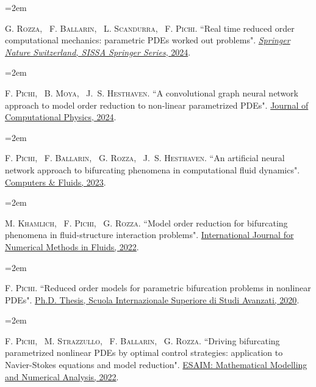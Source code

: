 \documentclass[
  usegeometry%
]{scrartcl}
\newcommand{\MarginText}[1]{\marginpar{\raggedleft\itshape\small#1}} %
\newcommand{\Description}[1]{\hangindent=2em\hangafter=0\noindent\raggedright\footnotesize{#1}\par\normalsize\vspace{1em}} %
\begin{document}
\begin{cv}{}
\Description{\MarginText{[9]}G. \textsc{Rozza}, ~F. \textsc{Ballarin}, ~L. \textsc{Scandurra}, ~F. \textsc{Pichi.} {\color{blue} ``Real time reduced order computational mechanics: parametric PDEs worked out problems".} \href{https://doi.org/10.1007/978-3-031-49892-3}{\textit{Springer Nature Switzerland, SISSA Springer Series}, 2024}.}

\Description{\MarginText{[8]}F. \textsc{Pichi}, ~B. \textsc{Moya}, ~J.~S. \textsc{Hesthaven.} {\color{blue} ``A convolutional graph neural network approach to model order reduction to non-linear parametrized PDEs".} \href{https://www.sciencedirect.com/science/article/pii/S0021999124000111}{Journal of Computational Physics, 2024}.}

\newpage
\Description{\MarginText{[7]}F. \textsc{Pichi}, ~F. \textsc{Ballarin}, ~G. \textsc{Rozza}, ~J.~S. \textsc{Hesthaven.} {\color{blue} ``An artificial neural network approach to bifurcating phenomena in computational fluid dynamics".} \href{https://doi.org/10.1016/j.compfluid.2023.105813}{Computers \& Fluids, 2023}.}


\Description{\MarginText{[6]}M. \textsc{Khamlich}, ~F. \textsc{Pichi}, ~G. \textsc{Rozza.} {\color{blue} ``Model order reduction for bifurcating phenomena in fluid-structure interaction problems".} \href{https://onlinelibrary.wiley.com/doi/abs/10.1002/fld.5118}{International Journal for Numerical Methods in Fluids, 2022}.}


\Description{\MarginText{[5]}F. \textsc{Pichi.} {\color{blue} ``Reduced order models for parametric bifurcation
problems in nonlinear {PDE}s".} \href{https://iris.sissa.it/handle/20.500.11767/114329}{Ph.D. Thesis, Scuola Internazionale Superiore di Studi Avanzati, 2020}.}



\Description{\MarginText{[4]}F. \textsc{Pichi}, ~M. \textsc{Strazzullo}, ~F. \textsc{Ballarin}, ~G. \textsc{Rozza.} {\color{blue} ``Driving bifurcating parametrized nonlinear PDEs by optimal control strategies: application to Navier-Stokes equations and model reduction".} \href{https://www.esaim-m2an.org/articles/m2an/abs/2022/04/m2an200206/m2an200206.html}{ESAIM: Mathematical Modelling and Numerical Analysis, 2022}.}




\end{cv}
\end{document}
